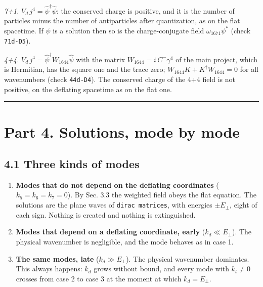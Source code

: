 \documentclass[
  10pt,
]{article}
\providecommand{\tightlist}{%
  \setlength{\itemsep}{0pt}\setlength{\parskip}{0pt}}
\begin{document}
\emph{7+1.} \(V_d\,j^4=\hat\psi^\dagger\hat\psi\): the conserved charge
is positive, and it is the number of particles minus the number of
antiparticles after quantization, as on the flat spacetime. If \(\psi\)
is a solution then so is the charge-conjugate field
\(\omega_{1671}\psi^*\) (check \texttt{71d-D5}).

\emph{4+4.} \(V_d\,j^4=\hat\psi^\dagger W_{1644}\hat\psi\) with the
matrix \(W_{1644}=i\,C^-\gamma^4\) of the main project, which is
Hermitian, has the square one and the trace zero;
\(W_{1644}K+K^\dagger W_{1644}=0\) for all wavenumbers (check
\texttt{44d-D4}). The conserved charge of the 4+4 field is not positive,
on the deflating spacetime as on the flat one.

\begin{center}\rule{0.5\linewidth}{0.5pt}\end{center}

\hypertarget{part-4.-solutions-mode-by-mode}{%
\section{Part 4. Solutions, mode by
mode}\label{part-4.-solutions-mode-by-mode}}

\hypertarget{three-kinds-of-modes}{%
\subsection{4.1 Three kinds of modes}\label{three-kinds-of-modes}}

\begin{enumerate}
\def\labelenumi{\arabic{enumi}.}
\tightlist
\item
  \textbf{Modes that do not depend on the deflating coordinates}
  (\(k_5=k_6=k_7=0\)). By Sec. 3.3 the weighted field obeys the flat
  equation. The solutions are the plane waves of
  \texttt{dirac\ matrices}, with energies \(\pm E_\perp\), eight of each
  sign. Nothing is created and nothing is extinguished.
\item
  \textbf{Modes that depend on a deflating coordinate, early}
  (\(k_d\ll E_\perp\)). The physical wavenumber is negligible, and the
  mode behaves as in case 1.
\item
  \textbf{The same modes, late} (\(k_d\gg E_\perp\)). The physical
  wavenumber dominates. This always happens: \(k_d\) grows without
  bound, and every mode with \(k_t\neq0\) crosses from case 2 to case 3
  at the moment at which \(k_d=E_\perp\).
\end{enumerate}
\end{document}
